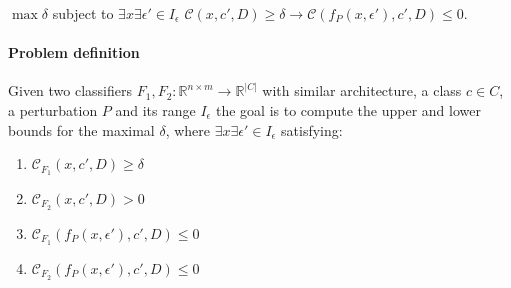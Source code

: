 $\max{\delta}$ subject to $\exists{x}\exists{\epsilon'}\in{I_\epsilon}$ $\mathcal{C}(x,c',D) \geq \delta \rightarrow \mathcal{C}(f_P(x,\epsilon'),c',D)\leq 0$.


\paragraph{Problem definition} Given two classifiers $F_1,F_2: \mathbb{R}^{n \times m} \rightarrow {\mathbb{R}}^{|C|}$ with similar architecture, a class $c\in{C}$, a perturbation $P$ and its range $I_\epsilon$ the goal is to compute the upper and lower bounds for the maximal $\delta$, where $\exists{x}\exists{\epsilon'}\in{I_\epsilon}$ satisfying:

\begin{enumerate}
    \item $\mathcal{C}_{F_1}(x,c',D) \geq \delta$
    \item $\mathcal{C}_{F_2}(x,c',D) > 0$
    \item $\mathcal{C}_{F_1}(f_P(x,\epsilon'),c',D)\leq 0$
    \item $\mathcal{C}_{F_2}(f_P(x,\epsilon'),c',D)\leq 0$
\end{enumerate}


